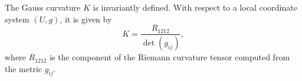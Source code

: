 The Gauss curvature $K$ is invariantly defined. With respect to a local coordinate system $(U, g)$, it is given by
$$K = \frac{R_{1212}}{\det(g_{ij})},$$
where $R_{1212}$ is the component of the Riemann curvature tensor computed from the metric $g_{ij}$.

